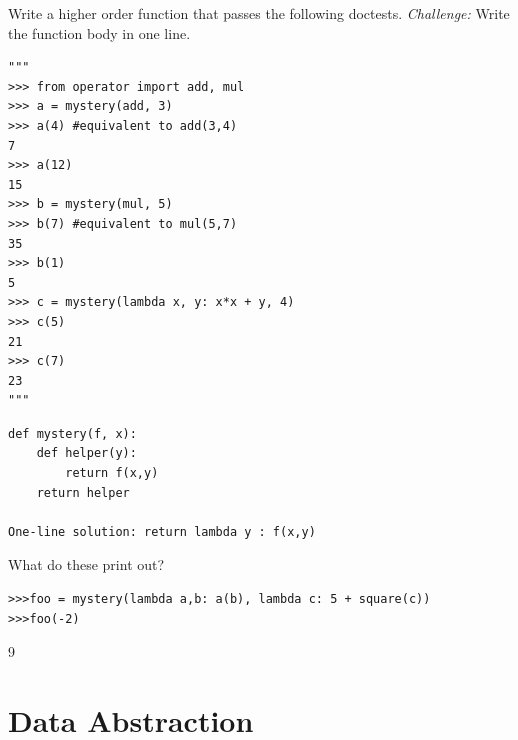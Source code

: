 \documentclass{exam}
\begin{document}
\begin{questions}
\begin{blocksection}
\question Write a higher order function that passes the following doctests.
\emph{Challenge:} Write the function body in one line.

\begin{lstlisting}
"""
>>> from operator import add, mul
>>> a = mystery(add, 3)
>>> a(4) #equivalent to add(3,4)
7
>>> a(12)
15
>>> b = mystery(mul, 5)
>>> b(7) #equivalent to mul(5,7)
35
>>> b(1)
5
>>> c = mystery(lambda x, y: x*x + y, 4)
>>> c(5)
21
>>> c(7)
23
"""
\end{lstlisting}

\begin{solution}[2in]
\begin{lstlisting}
def mystery(f, x):
    def helper(y):
        return f(x,y)
    return helper

One-line solution: return lambda y : f(x,y)
\end{lstlisting}
\end{solution}
\end{blocksection}

\question What do these print out?
\begin{lstlisting}
>>>foo = mystery(lambda a,b: a(b), lambda c: 5 + square(c))
>>>foo(-2)
\end{lstlisting}

\begin{solution}
9
\end{solution}

\end{questions}

\section{Data Abstraction}
\end{document}
